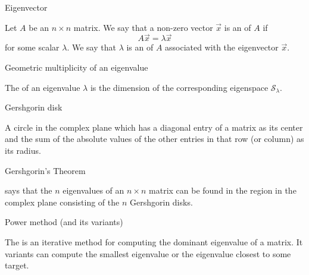 \documentclass{ximera}
\begin{document}
Eigenvector
\begin{expandable}
    Let $A$ be an $n \times n$ matrix.  We say that a non-zero vector $\vec{x}$ is an  of $A$ if $$A\vec{x} = \lambda \vec{x}$$
for some scalar $\lambda$.
We say that $\lambda$ is an  of $A$ associated with the eigenvector $\vec{x}$.
\end{expandable}


Geometric multiplicity of an eigenvalue
\begin{expandable}
    The  of an eigenvalue $\lambda$ is the dimension of the corresponding eigenspace $\mathcal{S}_\lambda$.
\end{expandable}


Gershgorin disk
\begin{expandable}
    A circle in the complex plane which has a diagonal entry of a matrix as its center and the sum of the absolute values of the other entries in that row (or column) as its radius.
\end{expandable}


Gershgorin's Theorem
\begin{expandable}
     says that the $n$ eigenvalues of an $n \times n$ matrix can be found in the region in the complex plane consisting of the $n$ Gershgorin disks.
\end{expandable}


Power method (and its variants)
\begin{expandable}
    The  is an iterative method for computing the dominant eigenvalue of a matrix. It variants can compute the smallest eigenvalue or the eigenvalue closest to some target.
\end{expandable}
\end{document}
